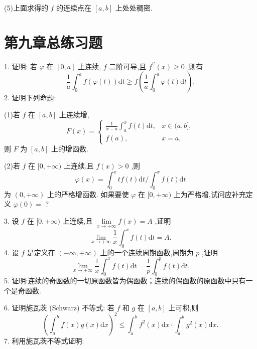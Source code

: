(5)上面求得的 \(f\) 的连续点在 \(\left\lbrack  {a,b}\right\rbrack\) 上处处稠密.

\section{第九章总练习题}

1. 证明: 若 \(\varphi\) 在 \(\left\lbrack  {0,a}\right\rbrack\) 上连续, \(f\) 二阶可导,且 \({f}^{\prime \prime }\left( x\right)  \geq  0\) ,则有
\[
\frac{1}{a}{\int }_{0}^{a}f\left( {\varphi \left( t\right) }\right) \mathrm{d}t \geq  f\left( {\frac{1}{a}{\int }_{0}^{a}\varphi \left( t\right) \mathrm{d}t}\right) .
\]
2. 证明下列命题:

(1)若 \(f\) 在 \(\left\lbrack  {a,b}\right\rbrack\) 上连续增,
\[
F\left( x\right)  = \left\{  \begin{array}{ll} \frac{1}{x - a}{\int }_{a}^{x}f\left( t\right) \mathrm{d}t, & x \in  (a,b\rbrack , \\  f\left( a\right) , & x = a, \end{array}\right.
\]
则 \(F\) 为 \(\left\lbrack  {a,b}\right\rbrack\) 上的增函数.

(2)若 \(f\) 在 \(\lbrack 0, + \infty )\) 上连续,且 \(f\left( x\right)  > 0\) ,则
\[
\varphi \left( x\right)  = {\int }_{0}^{x}{tf}\left( t\right) \mathrm{d}t/{\int }_{0}^{x}f\left( t\right) \mathrm{d}t
\]
为 \(\left( {0, + \infty }\right)\) 上的严格增函数. 如果要使 \(\varphi\) 在 \(\lbrack 0, + \infty )\) 上为严格增,试问应补充定义 \(\varphi \left( 0\right)  =\) ?

3. 设 \(f\) 在 \(\lbrack 0, + \infty )\) 上连续,且 \(\mathop{\lim }\limits_{{x \rightarrow   + \infty }}f\left( x\right)  = A\) ,证明
\[
\mathop{\lim }\limits_{{x \rightarrow   + \infty }}\frac{1}{x}{\int }_{0}^{x}f\left( t\right) \mathrm{d}t = A.
\]
4. 设 \(f\) 是定义在 \(\left( {-\infty , + \infty }\right)\) 上的一个连续周期函数,周期为 \(p\) ,证明
\[
\mathop{\lim }\limits_{{x \rightarrow   + \infty }}\frac{1}{x}{\int }_{0}^{x}f\left( t\right) \mathrm{d}t = \frac{1}{p}{\int }_{0}^{p}f\left( t\right) \mathrm{d}t.
\]
5. 证明:连续的奇函数的一切原函数皆为偶函数；连续的偶函数的原函数中只有一个是奇函数.

6. 证明施瓦茨 (Schwarz) 不等式: 若 \(f\) 和 \(g\) 在 \(\left\lbrack  {a,b}\right\rbrack\) 上可积,则
\[
{\left( {\int }_{a}^{b}f\left( x\right) g\left( x\right) \mathrm{d}x\right) }^{2} \leq  {\int }_{a}^{b}{f}^{2}\left( x\right) \mathrm{d}x \cdot  {\int }_{a}^{b}{g}^{2}\left( x\right) \mathrm{d}x.
\]
7. 利用施瓦茨不等式证明:

